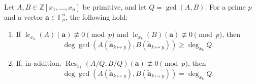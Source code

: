 \documentclass{article}
\numberwithin{equation}{section}
\begin{document}
\begin{lemma}\label{lem:int-degree-match}
Let $A, B \in \mathbb{Z}[x_1,\dots,x_n]$ be primitive, and let $Q = \gcd(A,B)$. 
For a prime $p$ and a vector $\mathbf{a} \in \mathbb{F}_p^n$, the following hold:

\begin{enumerate}
    \item If $\operatorname{lc}_{x_k}(A)(\mathbf{a}) \not\equiv 0 \pmod{p}$ and $\operatorname{lc}_{x_k}(B)(\mathbf{a}) \not\equiv 0 \pmod{p}$, then
    \[
    \deg \gcd(A(\mathbf{\check{a}}_{k \mapsto y} ), B(\mathbf{\check{a}}_{k \mapsto y} )) \ge \deg_{x_k} Q.
    \]
    \item If, in addition, $\operatorname{Res}_{x_k}(A/Q, B/Q)(\mathbf{a}) \not\equiv 0 \pmod{p}$, then
    \[
    \deg \gcd(A(\mathbf{\check{a}}_{k \mapsto y} ), B(\mathbf{\check{a}}_{k \mapsto y} )) = \deg_{x_k} Q.
    \]
\end{enumerate}
\end{lemma}
\end{document}
